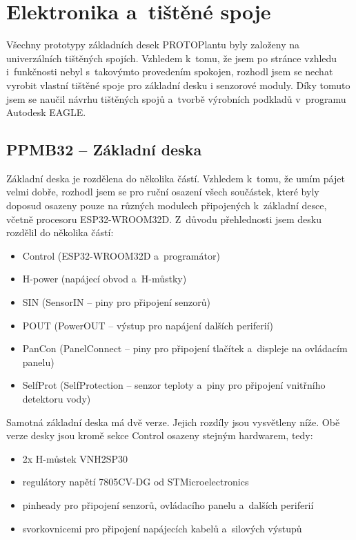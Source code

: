 \chapter{Elektronika a~tištěné spoje}
Všechny prototypy základních desek PROTOPlantu byly založeny na univerzálních tištěných spojích. Vzhledem k~tomu, že jsem po stránce vzhledu i~funkčnosti nebyl s~takovýmto provedením spokojen, rozhodl jsem se nechat vyrobit vlastní tištěné spoje pro základní desku i senzorové moduly.
Díky tomuto jsem se naučil návrhu tištěných spojů a~tvorbě výrobních podkladů v~programu Autodesk EAGLE.

\section{PPMB32 -- Základní deska}
\label{subsec:motherBoard}
Základní deska je rozdělena do několika částí. 
Vzhledem k~tomu, že umím pájet velmi dobře, rozhodl jsem se pro ruční osazení všech součástek, které byly doposud osazeny pouze na různých modulech připojených k~základní desce, včetně procesoru ESP32-WROOM32D.
Z~důvodu přehlednosti jsem desku rozdělil do několika částí:

\begin{itemize}
    \item Control (ESP32-WROOM32D a~programátor)
    \item H-power (napájecí obvod a~H-můstky)
    \item SIN (SensorIN -- piny pro připojení senzorů)
    \item POUT (PowerOUT -- výstup pro napájení dalších periferií)
    \item PanCon (PanelConnect -- piny pro připojení tlačítek a~displeje na ovlá\-da\-cím panelu)
    \item SelfProt (SelfProtection -- senzor teploty a~piny pro připojení vnitřního detektoru vody)
\end{itemize} 

Samotná základní deska má dvě verze. Jejich rozdíly jsou vysvětleny níže.
Obě verze desky jsou kromě sekce Control osazeny stejným hardwarem, tedy:

\begin{itemize}
    \item 2x H-můstek VNH2SP30
    \item regulátory napětí 7805CV-DG od STMicroelectronics
    \item pinheady pro připojení senzorů, ovládacího panelu a~dalších periferií
    \item svorkovnicemi pro připojení napájecích kabelů a~silových výstupů
\end{itemize}

